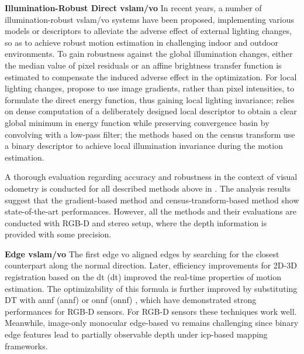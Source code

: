 \noindent \textbf{Illumination-Robust Direct \acrshort{vslam}/\acrshort{vo}} In recent years, a number of illumination-robust \acrshort{vslam}/\acrshort{vo} systems have been proposed, implementing various models or descriptors to alleviate the adverse effect of external lighting changes, so as to achieve robust motion estimation in challenging indoor and outdoor environments. To gain robustness against the global illumination changes, either the median value of pixel residuals \cite{meilland2011real} \cite{gonccalves2011real} \cite{bloesch2015robust} \cite{greene2016multi} or an affine brightness transfer function \cite{klose2013efficient} \cite{engel2015large} is estimated to compensate the induced adverse effect in the optimization. For local lighting changes, \cite{dai2017bundlefusion} propose to use image gradients, rather than pixel intensities, to formulate the direct energy function, thus gaining local lighting invariance; \cite{crivellaro2014robust} relies on dense computation of a deliberately designed local descriptor to obtain a clear global minimum in energy function while preserving convergence basin by convolving with a low-pass filter; the methods based on the census transform \cite{alismail2016direct} use a binary descriptor to achieve local illumination invariance during the motion estimation. 

A thorough evaluation regarding accuracy and robustness in the context of visual odometry is conducted for all described methods above in \cite{park2017illumination}. The analysis results suggest that the gradient-based method\cite{dai2017bundlefusion} and census-transform-based method \cite{park2017illumination} show state-of-the-art performances. However, all the methods and their evaluations are conducted with RGB-D and stereo setup, where the depth information is provided with some precision.

\noindent \textbf{Edge \acrshort{vslam}/\acrshort{vo}} The first edge \acrshort{vo} \cite{jose2015realtime} aligned edges by searching for the closest counterpart along the normal direction.  Later, efficiency improvements for 2D-3D registration based on the \acrlong{dt} (\acrshort{dt}) \cite{kneip2015sdicp} improved the real-time properties of motion estimation. The optimizability of this formula is further improved by substituting DT with \acrlong{annf} (\acrshort{annf}) \cite{zhou2017semi} or \acrlong{onnf} (\acrshort{onnf}) \cite{zhou2018canny}, which have demonstrated strong performances for RGB-D sensors. For RGB-D sensors these techniques work well. Meanwhile, image-only monocular edge-based \acrshort{vo} remains challenging since binary
edge features lead to partially observable depth under \acrshort{icp}-based mapping frameworks. 

